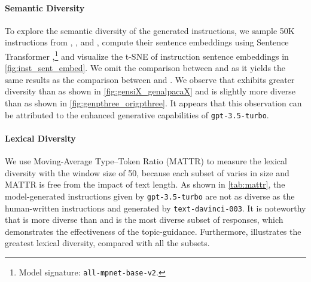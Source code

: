 \documentclass[11pt]{article}
\newcommand{\llm}[1]{\texttt{#1}\xspace}
\newcommand{\chatgpt}{\llm{gpt-3.5-turbo}}
\newcommand{\gptthree}{\llm{text-davinci-003}}
\begin{document}
\paragraph{Semantic Diversity}
To explore the semantic diversity of the generated instructions, we sample 50K instructions from , ,  and , compute their sentence embeddings using Sentence Transformer \cite{reimers-gurevych-2019-sentence},\footnote{Model signature: \texttt{all-mpnet-base-v2}.} and visualize the t-SNE of instruction sentence embeddings in \autoref{fig:inst_sent_embed}.
We omit the comparison between  and  as it yields the same results as the comparison between  and .
We observe that  exhibits greater diversity than  as shown in \autoref{fig:gensiX_genalpacaX} and  is slightly more diverse than  as shown in \autoref{fig:genpthree_origpthree}.
It appears that this observation can be attributed to the enhanced generative capabilities of \chatgpt.




\paragraph{Lexical Diversity} We use Moving-Average Type–Token Ratio (MATTR) \cite{DBLP:journals/jql/CovingtonM10} to measure the lexical diversity with the window size of 50, because each subset of  varies in size and MATTR is free from the impact of text length.
As shown in \autoref{tab:mattr}, the model-generated instructions  given by \chatgpt are not as diverse as the human-written instructions  and  generated by \gptthree.
It is noteworthy that  is more diverse than  and  is the most diverse subset of responses, which demonstrates the effectiveness of the topic-guidance.
Furthermore,  illustrates the greatest lexical diversity, compared with all the subsets.
\end{document}
